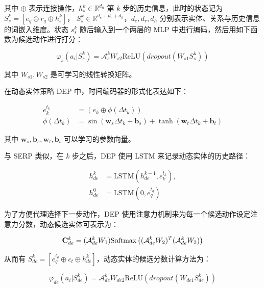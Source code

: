 \documentclass[a4paper, AutoFakeBold]{article}
\begin{document}
其中 $\oplus$ 表示连接操作，$h_s^k\in{\mathbb R}^{d_n}$ 第 $k$ 步的历史信息，此时的状态记为$S_s^k=[e_q\oplus r_q \oplus h^k_s]$， $S_s^k\in{\mathbb R}^{d_e+d_r+d_h}$，$d_e,d_r,d_h$ 分别表示实体、关系与历史信息的词嵌入维度。状态 $s_s^k$ 随后输入到一个两层的 MLP 中进行编码，然后用如下函数为候选动作进行打分：

\begin{equation}
\varphi_s(a_i|S^k_s)={\mathcal A}_s^k W_{s2}\text{ReLU}(dropout(W_{s1}S^k_s))
\end{equation}

其中 $W_{s1},W_{s2}$ 是可学习的线性转换矩阵。

在动态实体策略 DEP 中，时间编码器的形式化表达如下：

\begin{equation}
	\begin{aligned}
e_k^{t_k} & =(e_k\oplus\phi(\Delta t_k)) \\ 
\phi(\Delta t_k) & =\sin({\boldsymbol w}_s\Delta t_k+{\boldsymbol b}_s)+\tanh({\boldsymbol w}_t\Delta t_k+{\boldsymbol b}_t)
	\end{aligned}
\end{equation}

其中 ${\boldsymbol w}_s,{\boldsymbol b}_s,{\boldsymbol w}_t,{\boldsymbol b}_t$ 可以学习的参数向量。

与 SERP 类似，在 $k$ 步之后，DEP 使用 LSTM 来记录动态实体的历史路径：

\begin{equation}
	\begin{aligned}
h^k_{de} & =\text{LSTM}(h_{de}^{k-1},e_k^{t_k}), \\ 
h^0_{de} & =\text{LSTM}(0,e_q^{t_q})
	\end{aligned}
\end{equation}

为了方便代理选择下一步动作，DEP 使用注意力机制来为每一个候选动作设定注意力分数，动态候选实体可表示为：

\begin{equation}
{\bold C}^k_{de}=({\mathcal A}^k_{de}W_1)\text{Softmax}\left(({\mathcal A}^k_{de}W_2)^T({\mathcal A}^k_{de}W_3)\right)
\end{equation}

从而有 $S_{de}^k=[e_q^{t_q}\oplus c_t \oplus h^k_{de}]$，动态实体的候选分数计算方法为：

\begin{equation}
\varphi_{de}(a_i|S^k_{de})={\mathcal A}_{de}^k W_{de2}\text{ReLU}(dropout(W_{de1}S^k_{de}))
\end{equation}
\end{document}
